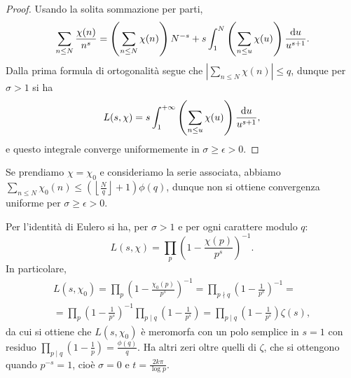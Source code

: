 \begin{proof}
  Usando la solita sommazione per parti,
  $$\sum_{n \le N} \frac{\chi(n)}{n^s}=\left(\sum_{n \le N} \chi(n)\right)N^{-s}+s\int_1^N\left(\sum_{n \le u} \chi(u)\right)\frac{\mathop{}\!\mathrm{d} u}{u^{s+1}}.$$
  Dalla prima formula di ortogonalità segue che $\displaystyle \left|\sum_{n \le N} \chi(n)\right| \le q$, dunque per $\sigma>1$ si ha
  $$L(s,\chi)=s\int_1^{+\infty} \left(\sum_{n \le u}\chi(u)\right)\frac{\mathop{}\!\mathrm{d} u}{u^{s+1}},$$
  e questo integrale converge uniformemente in $\sigma \ge \epsilon>0$.
\end{proof}

\begin{oss}
  Se prendiamo $\chi=\chi_0$ e consideriamo la serie associata, abbiamo $\displaystyle \sum_{n \le N} \chi_0(n) \le  \left(\left\lfloor \frac{N}{q}\right\rfloor+1\right)\phi(q)$, dunque non si ottiene convergenza uniforme per $\sigma \ge \epsilon>0$.
\end{oss}

\begin{oss}
  Per l'identità di Eulero si ha, per $\sigma>1$ e per ogni carattere modulo $q$:
  $$L(s,\chi)=\prod_p\left(1-\frac{\chi(p)}{p^s}\right)^{-1}.$$
  In particolare,
  \begin{gather*}
    L(s,\chi_0)=\prod_p\left(1-\frac{\chi_0(p)}{p^s}\right)^{-1}=\prod_{p \nmid q}\left(1-\frac{1}{p^s}\right)^{-1}= \\
    =\prod_p \left(1-\frac{1}{p^s}\right)^{-1}\prod_{p\mid q}\left(1-\frac{1}{p^s}\right)=\prod_{p\mid q}\left(1-\frac{1}{p^s}\right)\zeta(s),
  \end{gather*}
  da cui si ottiene che $L(s,\chi_0)$ è meromorfa con un polo semplice in $s=1$ con residuo $\displaystyle \prod_{p \mid q} \left(1-\frac{1}{p}\right)=\frac{\phi(q)}{q}$. Ha altri zeri oltre quelli di $\zeta$, che si ottengono quando $p^{-s}=1$, cioè $\sigma=0$ e $t=\frac{2k\pi}{\log{p}}$.
\end{oss}

